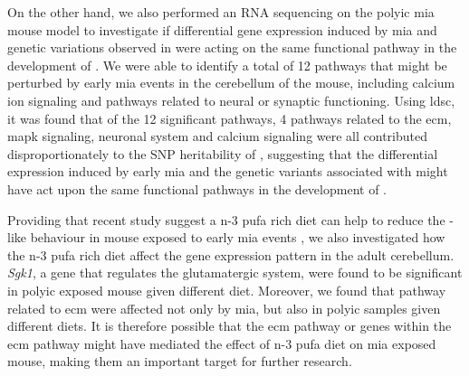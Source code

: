 \documentclass[12pt]{scrbook}
\newcommand*{\glng}{\glsentrylong}
\begin{document}
	On the other hand, we also performed an RNA sequencing on the \gls{polyic} \gls{mia} mouse model to investigate if differential gene expression induced by \gls{mia} and genetic variations observed in \glng{scz} were acting on the same functional pathway in the development of \glng{scz}.
	We were able to identify a total of 12 pathways that might be perturbed by early \gls{mia} events in the cerebellum of the mouse, including calcium ion signaling and pathways related to neural or synaptic functioning.
	Using \gls{ldsc}, it was found that of the 12 significant pathways, 4 pathways related to the \gls{ecm}, \gls{mapk} signaling, neuronal system and calcium signaling were all contributed disproportionately to the \gls{SNP} heritability of \glng{scz}, suggesting that the differential  expression induced by early \gls{mia} and the genetic variants associated with \glng{scz} might have act upon the same functional pathways in the development of \glng{scz}.
	
	Providing that recent study suggest a n-3 \gls{pufa} rich diet can help to reduce the \glng{scz}-like behaviour in mouse exposed to early \gls{mia} events \citep{Li2015}, we also investigated how the n-3 \gls{pufa} rich diet affect the gene expression pattern in the adult cerebellum.
	\textit{Sgk1}, a gene that regulates the glutamatergic system, were found to be significant in \gls{polyic} exposed mouse given different diet. 
	Moreover, we found that pathway related to \gls{ecm} were affected not only by \gls{mia}, but also in \gls{polyic} samples given different diets. 
	It is therefore possible that the \gls{ecm} pathway or genes within the \gls{ecm} pathway might have mediated the effect of n-3 \gls{pufa} diet on \gls{mia} exposed mouse, making them an important target for further research.
	
\end{document}
